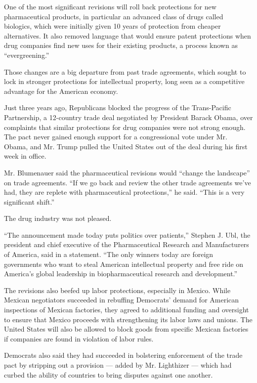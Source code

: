 One of the most significant revisions will roll back protections for new
pharmaceutical products, in particular an advanced class of drugs called
biologics, which were initially given 10 years of protection from
cheaper alternatives. It also removed language that would ensure patent
protections when drug companies find new uses for their existing
products, a process known as ``evergreening.''

Those changes are a big departure from past trade agreements, which
sought to lock in stronger protections for intellectual property, long
seen as a competitive advantage for the American economy.

Just three years ago, Republicans blocked the progress of the
Trans-Pacific Partnership, a 12-country trade deal negotiated by
President Barack Obama, over complaints that similar protections for
drug companies were not strong enough. The pact never gained enough
support for a congressional vote under Mr. Obama, and Mr. Trump pulled
the United States out of the deal during his first week in office.

Mr. Blumenauer said the pharmaceutical revisions would ``change the
landscape'' on trade agreements. ``If we go back and review the other
trade agreements we've had, they are replete with pharmaceutical
protections,'' he said. ``This is a very significant shift.''

The drug industry was not pleased.

``The announcement made today puts politics over patients,'' Stephen J.
Ubl, the president and chief executive of the Pharmaceutical Research
and Manufacturers of America, said in a statement. ``The only winners
today are foreign governments who want to steal American intellectual
property and free ride on America's global leadership in
biopharmaceutical research and development.''

The revisions also beefed up labor protections, especially in Mexico.
While Mexican negotiators succeeded in rebuffing Democrats' demand for
American inspections of Mexican factories, they agreed to additional
funding and oversight to ensure that Mexico proceeds with strengthening
its labor laws and unions. The United States will also be allowed to
block goods from specific Mexican factories if companies are found in
violation of labor rules.

Democrats also said they had succeeded in bolstering enforcement of the
trade pact by stripping out a provision --- added by Mr. Lighthizer ---
which had curbed the ability of countries to bring disputes against one
another.

